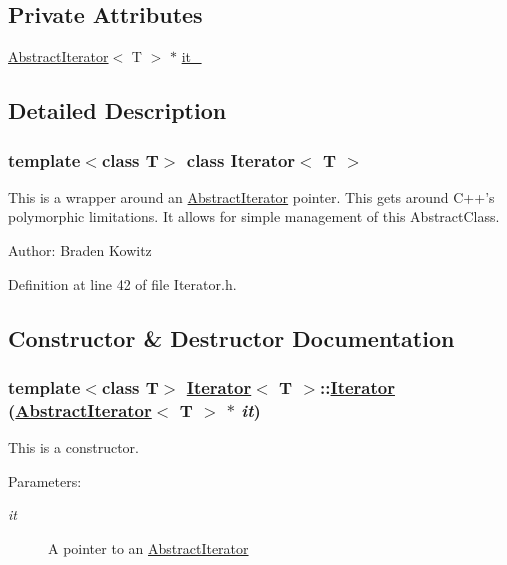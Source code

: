 \subsection*{Private Attributes}
\begin{CompactItemize}
\item 
\hyperlink{classAbstractIterator}{Abstract\-Iterator}$<$ T $>$ $\ast$ \hyperlink{classIterator_r0}{it\_\-}
\end{CompactItemize}


\subsection{Detailed Description}
\subsubsection*{template$<$class T$>$ class Iterator$<$ T $>$}

This is a wrapper around an \hyperlink{classAbstractIterator}{Abstract\-Iterator} pointer. This gets around C++'s polymorphic limitations. It allows for simple management of this Abstract\-Class. \begin{Desc}
\item[Author:]Braden Kowitz \end{Desc}




Definition at line 42 of file Iterator.h.

\subsection{Constructor \& Destructor Documentation}
\hypertarget{classIterator_a0}{
\subsubsection[Iterator]{\setlength{\rightskip}{0pt plus 5cm}template$<$class T$>$ \hyperlink{classIterator}{Iterator}$<$ T $>$::\hyperlink{classIterator}{Iterator} (\hyperlink{classAbstractIterator}{Abstract\-Iterator}$<$ T $>$ $\ast$ {\em it})}}
\label{classIterator_a0}


This is a constructor. \begin{Desc}
\item[Parameters:]
\begin{description}
\item[{\em it}]A pointer to an \hyperlink{classAbstractIterator}{Abstract\-Iterator} \end{description}
\end{Desc}


